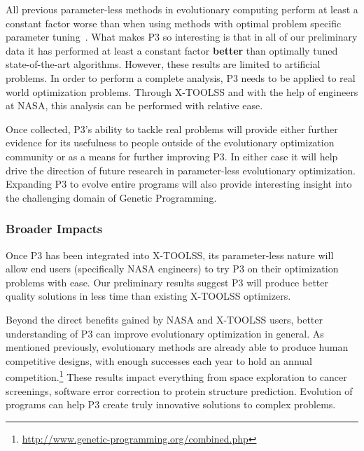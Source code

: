 \documentclass{article}
\begin{document}
All previous parameter-less methods in evolutionary computing perform at least a constant factor
worse than when using methods with optimal problem specific parameter tuning~\cite{pelikan:2004:parameterlesshboa}.
What makes P3 so interesting is that in all of our preliminary data it has performed at
least a constant factor \textbf{better} than optimally tuned state-of-the-art algorithms.
However, these results are limited to artificial problems.  In order to perform a complete analysis,
P3 needs to be applied to real world optimization problems.  Through X-TOOLSS and 
with the help of engineers at NASA, this
analysis can be performed with relative ease.

Once collected, P3's ability to tackle real problems will provide either further evidence for its usefulness
to people outside of the evolutionary optimization community or as a means for further improving P3.
In either case it will help drive the direction of future research in parameter-less evolutionary optimization.
Expanding P3 to evolve entire programs will also provide interesting insight into the challenging domain
of Genetic Programming.

\vspace{-2.5mm}
\subsubsection*{Broader Impacts}
Once P3 has been integrated into X-TOOLSS, its parameter-less nature will allow
end users (specifically NASA engineers) to try P3 on their optimization problems with ease.
Our preliminary results suggest P3 will produce better quality solutions in less time
than existing X-TOOLSS optimizers.

Beyond the direct benefits gained by NASA and X-TOOLSS users, better understanding of P3
can improve evolutionary optimization in general.  As mentioned previously, evolutionary
methods are already able to produce human competitive designs, with enough successes each
year to hold an annual competition.\footnote{\url{http://www.genetic-programming.org/combined.php}}
These results impact everything from space exploration to cancer screenings, software error correction
to protein structure prediction.  Evolution of programs can help P3 create truly innovative solutions to complex problems.


\newpage


\end{document}
